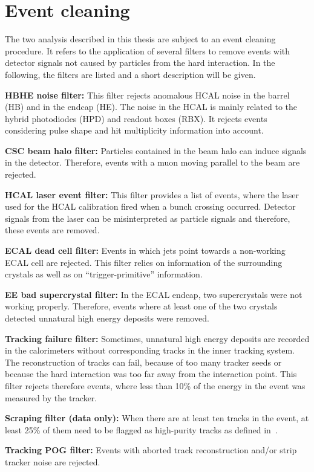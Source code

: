 \section{Event cleaning}
The two analysis described in this thesis are subject to an event cleaning procedure.
It refers to the application of several filters to remove events with detector signals not caused by particles from the hard interaction. 
In the following, the filters are listed and a short description will be given.
\begin{description} 
\item \textbf{HBHE noise filter:} This filter rejects anomalous HCAL noise in the barrel (HB) and in the endcap (HE). The noise in the HCAL is mainly related to the hybrid photodiodes (HPD) and readout boxes (RBX). It rejects events considering pulse shape and hit multiplicity information into account.
\item \textbf{CSC beam halo filter:} Particles contained in the beam halo can induce signals in the detector. Therefore, events with a muon moving parallel to the beam are rejected.  
\item \textbf{HCAL laser event filter:} This filter provides a list of events, where the laser used for the HCAL calibration fired when a bunch crossing occurred. Detector signals from the laser can be misinterpreted as particle signals and therefore, these events are removed.
\item \textbf{ECAL dead cell filter:} Events in which jets point towards a non-working ECAL cell are rejected. This filter relies on information of the surrounding crystals as well as on ``trigger-primitive'' information.
\item \textbf{EE bad supercrystal filter:} In the ECAL endcap, two supercrystals were not working properly. Therefore, events where at least one of the two crystals detected unnatural high energy deposits were removed. 
\item \textbf{Tracking failure filter:} Sometimes, unnatural high energy deposits are recorded in the calorimeters without corresponding tracks in the inner tracking system. The reconstruction of tracks can fail, because of too many tracker seeds or because the hard interaction was too far away from the interaction point.
This filter rejects therefore events, where less than 10\% of the energy in the event was measured by the tracker.  
\item \textbf{Scraping filter (data only):} When there are at least ten tracks in the event, at least 25\% of them need to be flagged as high-purity tracks as defined in~\cite{bib:CMS:Tracking_2010}.
\item \textbf{Tracking POG filter:} Events with aborted track reconstruction and/or strip tracker noise are rejected.
\end{description}



